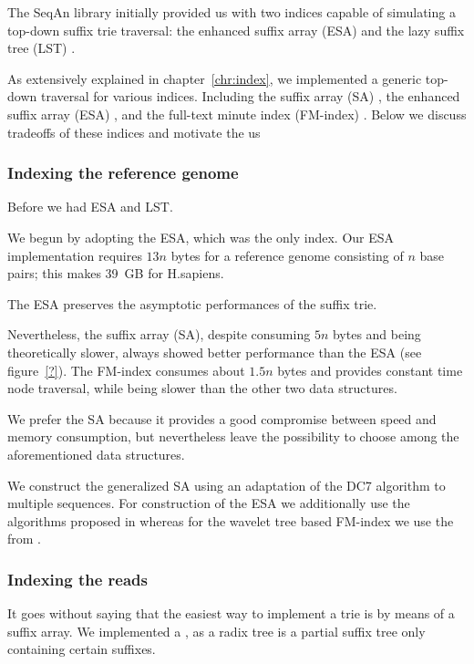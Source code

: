 The SeqAn library initially provided us with two indices capable of simulating a top-down suffix trie traversal: the enhanced suffix array (ESA) \citep{Abouelhoda2004} and the lazy suffix tree (LST) \citep{Giegerich1999}.

As extensively explained in chapter~\ref{chr:index}, we implemented a generic top-down traversal for various indices.
Including the suffix array (SA) \citep{Manber1990}, the enhanced suffix array (ESA) \citep{Abouelhoda2004}, and the full-text minute index (FM-index) \citep{Ferragina2001}.
Below we discuss tradeoffs of these indices and motivate the us

\subsubsection{Indexing the reference genome}

Before we had ESA and LST.

We begun by adopting the ESA, which was the only index.
Our ESA implementation requires $13n$ bytes for a reference genome consisting of $n$ base pairs; this makes 39~GB for H.sapiens.

The ESA preserves the asymptotic performances of the suffix trie.

Nevertheless, the suffix array (SA), despite consuming $5n$ bytes and being theoretically slower, always showed better performance than the ESA (see figure~\ref{?}).
The FM-index consumes about $1.5n$ bytes and provides constant time node traversal, while being slower than the other two data structures.

We prefer the SA because it provides a good compromise between speed and memory consumption, but nevertheless leave the possibility to choose among the aforementioned data structures.

We construct the generalized SA using an adaptation of the DC7 algorithm \citep{Dementiev2008} to multiple sequences.
For construction of the ESA we additionally use the algorithms proposed in \citep{Kasai2001,Abouelhoda2004} whereas for the wavelet tree based FM-index we use the from \citep{Grossi2003}.

\subsubsection{Indexing the reads}

It goes without saying that the easiest way to implement a trie is by means of a suffix array.
We implemented a , as a radix tree is a partial suffix tree only containing certain suffixes.

